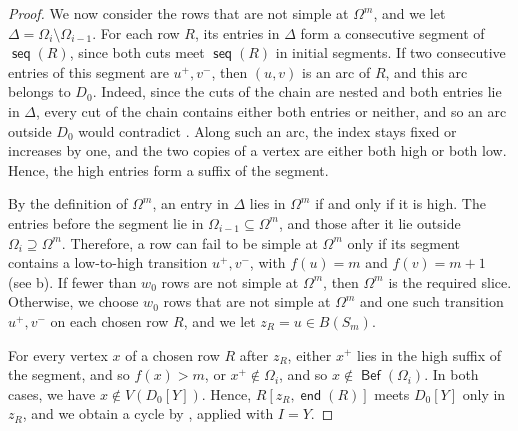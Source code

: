 \documentclass[fontsize=12pt,leading=14pt]{fullpaper}
\DeclareMathOperator{\en}{\mathsf{end}}
\DeclareMathOperator{\Bef}{\mathsf{Bef}}
\DeclareMathOperator{\seq}{\mathsf{seq}}
\begin{document}
\begin{proof}
  We now consider the rows that are not simple at $\Omega^m$, and we let $\Delta=\Omega_i\setminus\Omega_{i-1}$.
  For each row $R$, its entries in $\Delta$ form a consecutive segment of $\seq(R)$, since both cuts meet $\seq(R)$ in initial segments.
  If two consecutive entries of this segment are $u^+,v^-$, then $(u,v)$ is an arc of $R$, and this arc belongs to $D_0$.
  Indeed, since the cuts of the chain are nested and both entries lie in $\Delta$, every cut of the chain contains either both entries or neither, and so an arc outside $D_0$ would contradict .
  Along such an arc, the index stays fixed or increases by one, and the two copies of a vertex are either both high or both low.
  Hence, the high entries form a suffix of the segment.

  By the definition of $\Omega^m$, an entry in $\Delta$ lies in $\Omega^m$ if and only if it is high.
  The entries before the segment lie in $\Omega_{i-1}\subseteq\Omega^m$, and those after it lie outside $\Omega_i\supseteq\Omega^m$.
  Therefore, a row can fail to be simple at $\Omega^m$ only if its segment contains a low-to-high transition $u^+,v^-$, with $f(u)=m$ and $f(v)=m+1$ (see b).
  If fewer than $w_0$ rows are not simple at $\Omega^m$, then $\Omega^m$ is the required slice.
  Otherwise, we choose $w_0$ rows that are not simple at $\Omega^m$ and one such transition $u^+,v^-$ on each chosen row $R$, and we let $z_R=u\in B(S_m)$.

  For every vertex $x$ of a chosen row $R$ after $z_R$, either $x^+$ lies in the high suffix of the segment, and so $f(x)>m$, or $x^+\notin\Omega_i$, and so $x\notin\Bef(\Omega_i)$.
  In both cases, we have $x\notin V(D_0[Y])$.
  Hence, $R[z_R,\en(R)]$ meets $D_0[Y]$ only in $z_R$, and we obtain a cycle by , applied with $I=Y$.


\end{proof}
\end{document}
